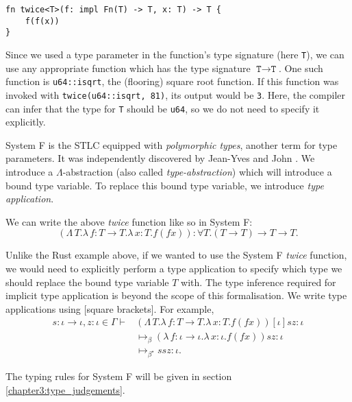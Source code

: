 \begin{verbatim}
fn twice<T>(f: impl Fn(T) -> T, x: T) -> T {
    f(f(x))
}
\end{verbatim}

Since we used a type parameter in the function's type signature (here \texttt{T}), we can use any
appropriate function which has the type signature $\texttt{T} \to \texttt{T}$. One such function is
\texttt{u64::isqrt}, the (flooring) square root function. If this function was invoked with
\texttt{twice(u64::isqrt, 81)}, its output would be \texttt{3}. Here, the compiler can infer that
the type for \texttt{T} should be \texttt{u64}, so we do not need to specify it explicitly.

System F is the STLC equipped with \textit{polymorphic types}, another term for type parameters. It
was independently discovered by Jean-Yves \citet{girard_interpretation_1972} and John
\citet{goos_towards_1974}. We introduce a $\Lambda$-abstraction (also called
\textit{type-abstraction}) which will introduce a bound type variable. To replace this bound type
variable, we introduce \textit{type application}.

We can write the above \textit{twice} function like so in System F:
\begin{equation*}
  (\Lambda \, T. \lambda \, f \colon T \to T . \lambda \, x \colon T . f (f x))
  \colon \forall T . (T \to T) \to T \to T.
\end{equation*}

Unlike the Rust example above, if we wanted to use the System F \textit{twice} function, we would
need to explicitly perform a type application to specify which type we should replace the bound type
variable $T$ with. The type inference required for implicit type application is beyond the scope of
this formalisation. We write type applications using [square brackets]. For example,
\begin{align*}
  s \colon \iota \to \iota, z \colon \iota \in \Gamma \vdash
    &(\Lambda \, T. \lambda \, f \colon T \to T . \lambda \, x \colon T . f (f x))
    [\iota] s z \colon \iota\\
  &\mapsto_{\beta}
    (\lambda \, f \colon \iota \to \iota . \lambda \, x \colon \iota . f (f x)) s z \colon \iota\\
  &\mapsto_{\beta^{\star}} s s z \colon \iota.
\end{align*}

The typing rules for System F will be given in section \ref{chapter3:type_judgements}.
